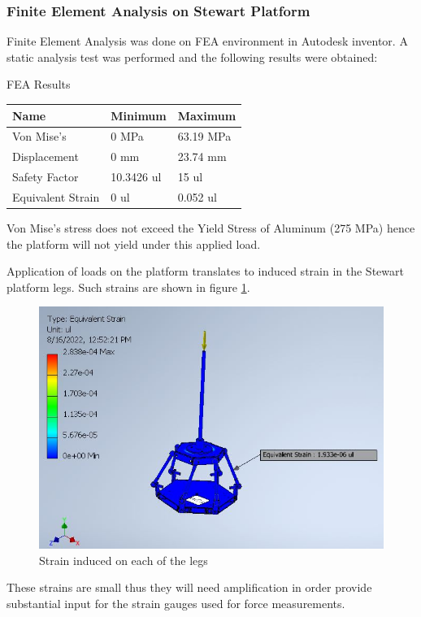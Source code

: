 \subsubsection{Finite Element Analysis on Stewart Platform}
Finite Element Analysis was done on FEA environment in Autodesk inventor. A static analysis test was performed and the following results were obtained:
\begin{table}[H]
	\caption{FEA Results}
\end{table}
\begin{center}
	\begin{tabular}{|l|l|l|}
		\hline
		\textbf{Name}     & \textbf{Minimum} & \textbf{Maximum} \\
		\hline
		Von Mise's        & 0 MPa            & 63.19 MPa        \\
		\hline
		Displacement      & 0 mm             & 23.74 mm         \\
		\hline
		Safety Factor     & 10.3426 ul       & 15 ul            \\
		\hline
		Equivalent Strain & 0 ul             & 0.052 ul         \\
		\hline
	\end{tabular}
\end{center}
Von Mise's stress does not exceed the Yield Stress of Aluminum (275 MPa) hence the platform will not yield under this applied load.

Application of loads on the platform translates to induced strain in the Stewart platform legs. Such strains are shown in figure \ref{eq}.
\begin{center}
	\begin{figure}[H]
		\centering
		\includegraphics[width=0.6\linewidth]{Figures/Equivalent}
		\caption[Equivalent strain]{Strain induced on each of the legs}
		\label{eq}
	\end{figure}
\end{center}
These strains are small thus they will need amplification in order provide substantial input for the strain gauges used for force measurements.
